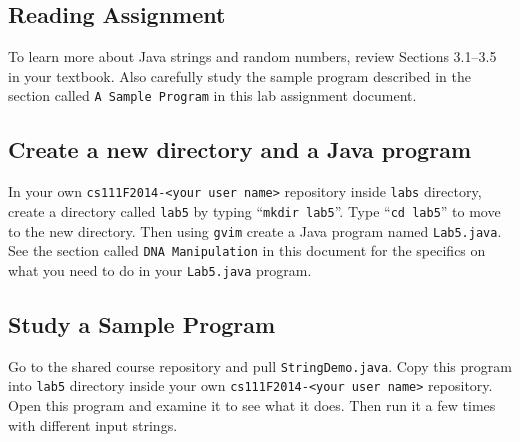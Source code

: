 \vspace{-0.05in}
\subsection*{Reading Assignment}
\vspace{-0.05in}
To learn more about Java strings and random numbers, review Sections 3.1--3.5 in your textbook. Also carefully study the sample program
described in the section called {\tt A Sample Program} in this lab assignment document.

\vspace{-0.05in}
\subsection*{Create a new directory and a Java program}
\vspace{-0.05in}
In your own {\tt cs111F2014-<your user name>} repository inside {\tt labs} directory, create a directory called {\tt lab5} by typing ``{\tt mkdir lab5}''. Type ``{\tt cd lab5}'' to move to the new directory.  Then using {\tt gvim} create a Java program named {\tt Lab5.java}. See the section called {\tt DNA Manipulation} in this document for the specifics on what you need to do in your {\tt Lab5.java} program.

\vspace{-0.05in}
\subsection*{Study a Sample Program}
\vspace{-0.05in}
Go to the shared course repository and pull {\tt StringDemo.java}. Copy this program into {\tt lab5} directory
inside your own {\tt cs111F2014-<your user name>} repository.
Open this program and examine it to see what it does. Then
run it a few times with different input strings.\\

